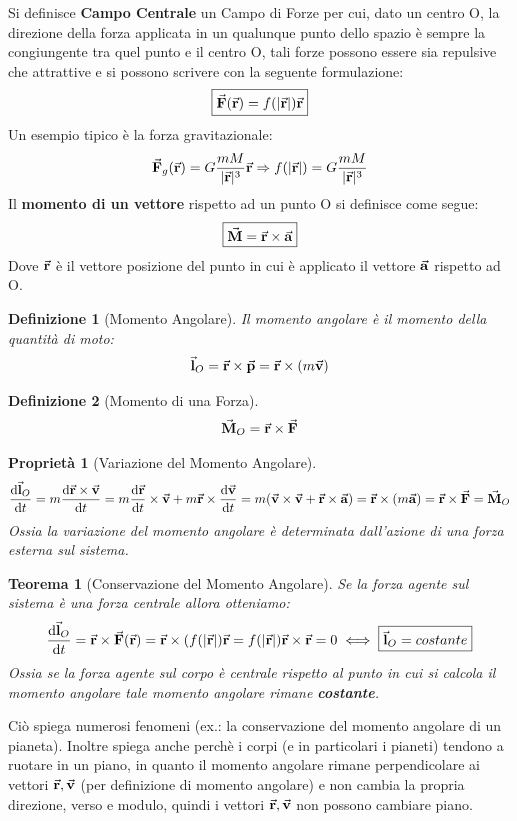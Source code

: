 \documentclass{article}
\newtheorem{thm}{Teorema}[section]
\newtheorem{property}{Proprietà}[section]
\newtheorem{defn}{Definizione}[section]
\newcommand{\then}{\ensuremath{\Rightarrow}}
\renewcommand{\a}{\va{a}}
\renewcommand{\v}{\va{v}}
\renewcommand{\r}{\va{r}}
\newcommand{\F}{\va{F}}
\newcommand{\M}{\va{M}}
\renewcommand{\l}{\va{l}}
\newcommand{\p}{\va{p}}
\begin{document}
Si definisce \textbf{Campo Centrale} un Campo di Forze per cui, dato un centro O, la direzione della forza applicata in un qualunque punto dello spazio è sempre la congiungente tra quel punto e il centro O, tali forze possono essere sia repulsive che attrattive e si possono scrivere con la seguente formulazione:
\begin{equation}
    \boxed{\F(\r)=f(|\r|)\r}
\end{equation}
Un esempio tipico è la forza gravitazionale:
\[\F_g(\r)=G\frac{mM}{|\r|^3}\r\then f(|\r|)=G\frac{mM}{|\r|^3}\]
Il \textbf{momento di un vettore} rispetto ad un punto O si definisce come segue:
\begin{equation}
    \boxed{\M=\r\times\a}
\end{equation}
Dove $\r$ è il vettore posizione del punto in cui è applicato il vettore $\a$ rispetto ad O.
\begin{defn}[Momento Angolare]
Il momento angolare è il momento della quantità di moto:
\[\l_O=\r\times\p=\r\times(m\v)\]
\end{defn}
\begin{defn}[Momento di una Forza]
\[\M_O=\r\times\F\]
\end{defn}
\begin{property}[Variazione del Momento Angolare]
\begin{equation}
    \dv{\l_O}{t}=m\dv{\r\times\v}{t}=m\dv{\r}{t}\times\v+m\r\times\dv{\v}{t}=m(\v\times\v+\r\times\a)=\r\times(m\a)=\r\times\F=\M_O
\end{equation}
Ossia la variazione del momento angolare è determinata dall'azione di una forza esterna sul sistema.
\end{property}
\begin{thm}[Conservazione del Momento Angolare]
Se la forza agente sul sistema è una forza centrale allora otteniamo:
\[\dv{\l_O}{t}=\r\times\F(\r)=\r\times(f(|\r|)\r=f(|\r|)\r\times\r=0\iff\boxed{\l_O=costante}\]
Ossia se la forza agente sul corpo è centrale rispetto al punto in cui si calcola il momento angolare tale momento angolare rimane \textbf{costante}.
\end{thm}
Ciò spiega numerosi fenomeni (ex.: la conservazione del momento angolare di un pianeta).
Inoltre spiega anche perchè i corpi (e in particolari i pianeti) tendono a ruotare in un piano, in quanto il momento angolare rimane perpendicolare ai vettori $\r,\v$ (per definizione di momento angolare) e non cambia la propria direzione, verso e modulo, quindi i vettori $\r,\v$ non possono cambiare piano.
\end{document}
